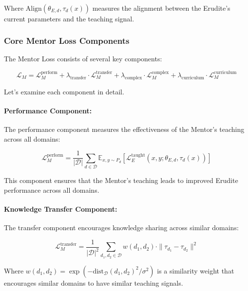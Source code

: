 Where $\text{Align}(\theta_{E,d}, \tau_d(x))$ measures the alignment between the Erudite's current parameters and the teaching signal.

\subsubsection{Core Mentor Loss Components}

The Mentor Loss consists of several key components:

\begin{equation}
\mathcal{L}_M = \mathcal{L}_M^{\text{perform}} + \lambda_{\text{transfer}} \cdot \mathcal{L}_M^{\text{transfer}} + \lambda_{\text{complex}} \cdot \mathcal{L}_M^{\text{complex}} + \lambda_{\text{curriculum}} \cdot \mathcal{L}_M^{\text{curriculum}}
\end{equation}

Let's examine each component in detail.

\paragraph{Performance Component:}
The performance component measures the effectiveness of the Mentor's teaching across all domains:

\begin{equation}
\mathcal{L}_M^{\text{perform}} = \frac{1}{|\mathcal{D}|} \sum_{d \in \mathcal{D}} \mathbb{E}_{x,y \sim P_d} [\mathcal{L}_{E}^{\text{taught}}(x, y; \theta_{E,d}, \tau_d(x))]
\end{equation}

This component ensures that the Mentor's teaching leads to improved Erudite performance across all domains.

\paragraph{Knowledge Transfer Component:}
The transfer component encourages knowledge sharing across similar domains:

\begin{equation}
\mathcal{L}_M^{\text{transfer}} = \frac{1}{|\mathcal{D}|^2} \sum_{d_1, d_2 \in \mathcal{D}} w(d_1, d_2) \cdot \|\tau_{d_1} - \tau_{d_2}\|^2
\end{equation}

Where $w(d_1, d_2) = \exp(-\text{dist}_{\mathcal{D}}(d_1, d_2)^2 / \sigma^2)$ is a similarity weight that encourages similar domains to have similar teaching signals.

